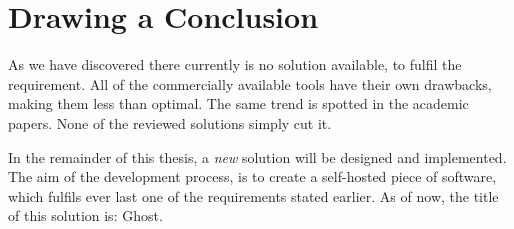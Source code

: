	\section{Drawing a Conclusion}
		As we have discovered there currently is no solution available, to fulfil the requirement. All of the commercially available tools have their own drawbacks, making them less than optimal. The same trend is spotted in the academic papers. None of the reviewed solutions simply cut it.

		In the remainder of this thesis, a \emph{new} solution will be designed and implemented. The aim of the development process, is to create a self-hosted piece of software, which fulfils ever last one of the requirements stated earlier. As of now, the title of this solution is: Ghost.